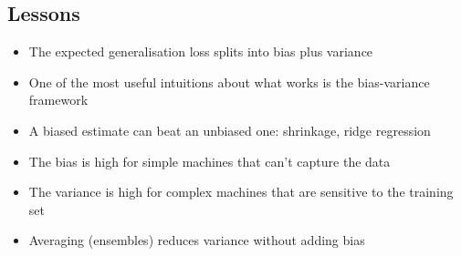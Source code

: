 
\begin{slide}
\section[-2]{Lessons}

\begin{PauseHighLight}
  \begin{itemize}
  \item The expected generalisation loss splits into bias plus
    variance\pause
  \item One of the most useful intuitions about what works is the
    bias-variance framework\pause
  \item A biased estimate can beat an unbiased one: shrinkage, ridge
    regression\pause
  \item The bias is high for simple machines that can't capture the
    data\pause
  \item The variance is high for complex machines that are sensitive
    to the training set\pause
  \item Averaging (ensembles) reduces variance without adding
    bias\pause
  \end{itemize}
\end{PauseHighLight}

\end{slide}




